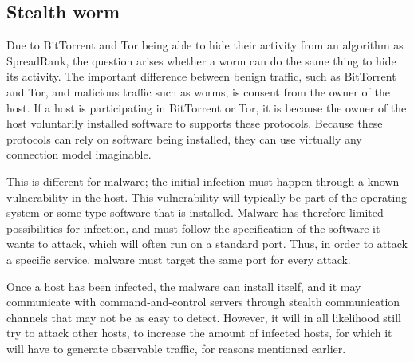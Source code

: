 \subsection{Stealth worm}
Due to BitTorrent and Tor being able to hide their activity from an algorithm as SpreadRank,
the question arises whether a worm can do the same thing to hide its activity.
The important difference between benign traffic, such as BitTorrent and Tor, and malicious traffic such as worms,
is consent from the owner of the host.
If a host is participating in BitTorrent or Tor, it is because the owner of the host voluntarily installed software to supports these protocols.
Because these protocols can rely on software being installed, they can use virtually any connection model imaginable.

This is different for malware;
the initial infection must happen through a known vulnerability in the host.
This vulnerability will typically be part of the operating system or some type software that is installed.
Malware has therefore limited possibilities for infection, and must follow the specification of the software it wants to attack, which will often run on a standard port.
Thus, in order to attack a specific service, malware must target the same port for every attack.

Once a host has been infected, the malware can install itself, and it may communicate with command-and-control servers through stealth communication channels that may not be as easy to detect.
However, it will in all likelihood still try to attack other hosts, to increase the amount of infected hosts, for which it will have to generate observable traffic, for reasons mentioned earlier.



